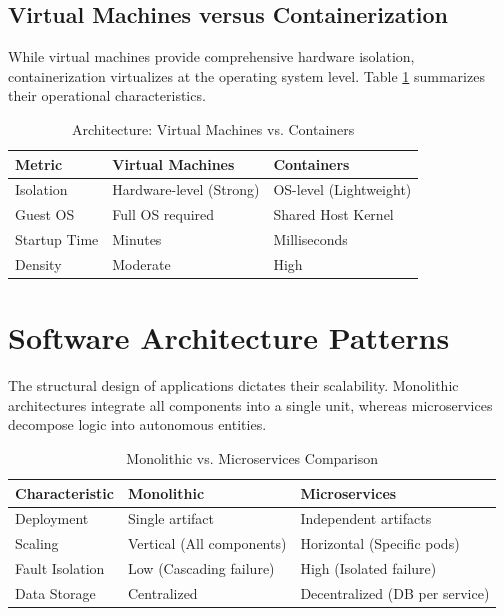 \documentclass[12pt,a4paper]{report}
\begin{document}
\subsection{Virtual Machines versus Containerization}
While virtual machines provide comprehensive hardware isolation, containerization virtualizes at the operating system level. Table \ref{tab:vm_vs_container} summarizes their operational characteristics.

\begin{table}[htbp]
\centering
\caption{Architecture: Virtual Machines vs. Containers}
\label{tab:vm_vs_container}
\begin{tabular}{@{}lll@{}}
\toprule
\textbf{Metric} & \textbf{Virtual Machines} & \textbf{Containers} \\ \midrule
Isolation & Hardware-level (Strong) & OS-level (Lightweight) \\
Guest OS & Full OS required & Shared Host Kernel \\
Startup Time & Minutes & Milliseconds \\
Density & Moderate & High \\ \bottomrule
\end{tabular}
\end{table}

\section{Software Architecture Patterns}

The structural design of applications dictates their scalability. Monolithic architectures integrate all components into a single unit, whereas microservices decompose logic into autonomous entities.

\begin{table}[htbp]
\centering
\caption{Monolithic vs. Microservices Comparison}
\label{tab:monolith_vs_micro}
\begin{tabular}{@{}lll@{}}
\toprule
\textbf{Characteristic} & \textbf{Monolithic} & \textbf{Microservices} \\ \midrule
Deployment & Single artifact & Independent artifacts \\
Scaling & Vertical (All components) & Horizontal (Specific pods) \\
Fault Isolation & Low (Cascading failure) & High (Isolated failure) \\
Data Storage & Centralized & Decentralized (DB per service) \\ \bottomrule
\end{tabular}
\end{table}
\end{document}
